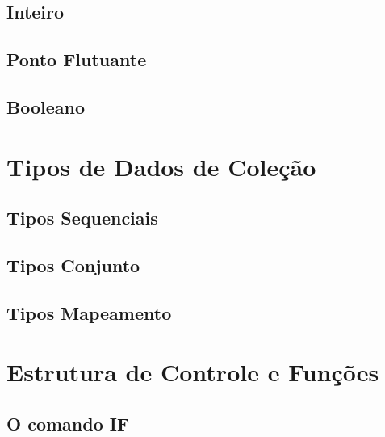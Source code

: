			\subsection{Inteiro}
			
			\subsection{Ponto Flutuante}
			
			
			\subsection{Booleano}
			
	
    \section{Tipos de Dados de Cole\c{c}\~{a}o}


            \subsection{Tipos Sequenciais}


            \subsection{Tipos Conjunto}


            \subsection{Tipos Mapeamento}




    \section{Estrutura de Controle e Fun\c{c}\~{o}es}

            \subsection{O comando IF}


